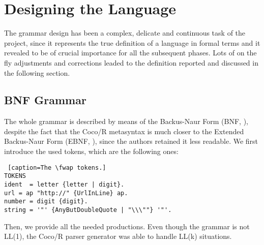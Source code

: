 \chapter{\label{chapter2} Designing the Language}

The grammar design has been a complex, delicate and continuous task of the project, since it represents the true definition of a language in formal terms and it revealed to be of crucial importance for all the subsequent phases. Lots of on the fly adjustments and corrections leaded to the definition reported and discussed in the following section.

\section{BNF Grammar}

The whole grammar is described by means of the Backus-Naur Form (BNF, \cite{bnf}), despite the fact that the Coco/R metasyntax is much closer to the Extended Backus-Naur Form (EBNF, \cite{ebnf}), since the authors retained it less readable.  We first introduce the used tokens, which are the following ones:

\begin{lstlisting} [caption=The \fwap tokens.]
TOKENS
ident  = letter {letter | digit}.
url = ap "http://" {UrlInLine} ap.
number = digit {digit}.
string = '"' {AnyButDoubleQuote | "\\\""} '"'.
\end{lstlisting}

Then, we provide all the needed productions. Even though the grammar is not LL(1), the Coco/R parser generator was able to handle LL(k) situations.

